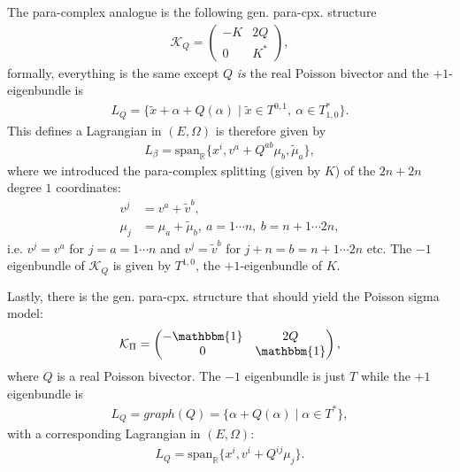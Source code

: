 \documentclass{article}
\newcommand{\KK}{\mathcal{K}}
\newcommand{\id}{{\mathbbm{1}}}
\newcommand{\ap}{\alpha}
\def\tl{\tilde}
\theoremstyle{definition}
\theoremstyle{definition}
\theoremstyle{remark}
\theoremstyle{ref}
\begin{document}
The para-complex analogue is the following gen. para-cpx. structure
\begin{align*}
\KK_Q=\begin{pmatrix}
-K & 2Q \\
0 & K^*
\end{pmatrix},
\end{align*}
formally, everything is the same except $Q$ {\it is} the real Poisson bivector and the $+1$-eigenbundle is
\begin{align*}
L_Q=\{\tl{x}+\ap+Q(\ap)\mid \tl{x}\in T^{0,1},\ \ap \in T^*_{1,0}\}.
\end{align*}
This defines a Lagrangian in $(E,\Omega)$ is therefore given by
\begin{align*}
L_\beta=\text{span}_{\mathbb R}\{x^i,v^a+Q^{ab}\mu_b,\tl{\mu}_{{a}}\},
\end{align*}
where we introduced the para-complex splitting (given by $K$) of the $2n+2n$ degree $1$ coordinates:
\begin{align*}
v^j&=v^a+\tl{v}^b,\\
\mu_j&=\mu_a+\tl{\mu}_b,\ a=1\cdots n,\ b=n+1\cdots 2n,
\end{align*}
i.e. $v^j=v^a$ for $j=a=1\cdots n$ and $v^j=\tl{v}^b$ for $j+n=b=n+1\cdots 2n$ etc. The $-1$ eigenbundle of $\KK_Q$ is given by $T^{1,0}$, the $+1$-eigenbundle of $K$.

Lastly, there is the gen. para-cpx. structure that should yield the Poisson sigma model:
\begin{align*}
\KK_\Pi=
\begin{pmatrix}
-\id & 2Q \\
0 & \id
\end{pmatrix},
\end{align*}
where $Q$ is a real Poisson bivector. The $-1$ eigenbundle is just $T$ while the $+1$ eigenbundle is
\begin{align*}
L_Q=graph(Q)=\{\ap+Q(\ap)\mid \ap \in T^*\},
\end{align*}
with a corresponding Lagrangian in $(E,\Omega)$:
\begin{align*}
L_Q=\text{span}_{\mathbb R}\{x^i,v^i+Q^{ij}\mu_j\}.
\end{align*}





\end{document}
